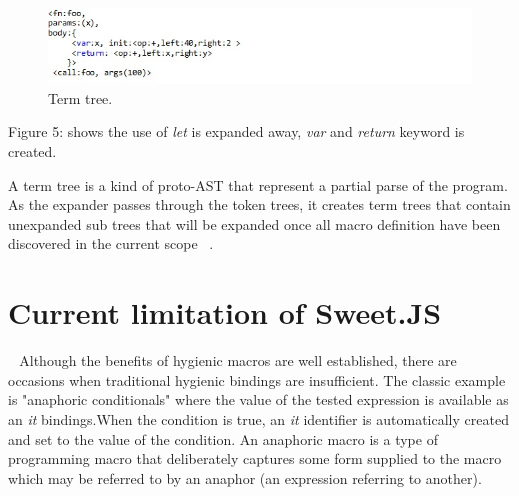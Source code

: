 \begin{figure}[htb]
\centering
\includegraphics[width=1.0\textwidth]{images/enforest1.jpg}
\caption{Term tree.} 
\label{fig:AST}

\end{figure}

Figure 5: shows the use of \textit{let} is expanded away, \textit{var} and \textit{return} keyword is created.

A term tree is a kind of proto-AST that represent a partial parse of the program. As the expander passes through the token trees, it creates term trees that contain unexpanded sub trees that will be expanded once all macro definition have been discovered in the current scope ~\cite{bib2}.

\section{Current limitation of Sweet.JS}
\textcolor{white}{``}
Although the benefits of hygienic macros are well established, there are occasions when traditional hygienic bindings are insufficient. The classic example is "anaphoric conditionals" where the value of the tested expression is available as an \textit{it} bindings.When the condition is true, an \textit{it} identifier is automatically created and set to the value of the condition. An anaphoric macro is a type of programming macro that deliberately captures some form supplied to the macro which may be referred to by an anaphor (an expression referring to another).
\textcolor{white}{''}

